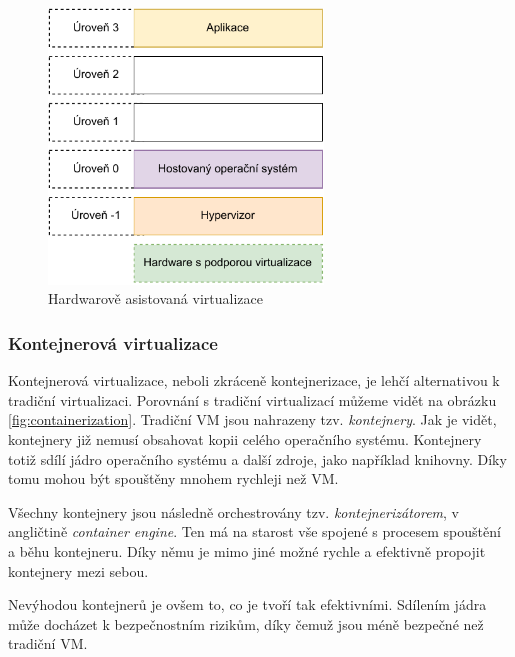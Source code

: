 \begin{figure}[htbp]
    \centering 
    \includegraphics[width=0.65\textwidth]{assets/img/hardware-asssist-virt.pdf}
    \caption{Hardwarově asistovaná virtualizace}
    \label{fig:hardware_asssist_virt}
\end{figure}

\subsubsection{Kontejnerová virtualizace}

Kontejnerová virtualizace, neboli zkráceně kontejnerizace, je lehčí alternativou k tradiční virtualizaci. Porovnání s tradiční virtualizací můžeme vidět na obrázku \ref{fig:containerization}. Tradiční VM jsou nahrazeny tzv. \textit{kontejnery}. Jak je vidět, kontejnery již nemusí obsahovat kopii celého operačního systému. Kontejnery totiž sdílí jádro operačního systému a další zdroje, jako například knihovny. Díky tomu mohou být spouštěny mnohem rychleji než VM. \cite{8693491}

Všechny kontejnery jsou následně orchestrovány tzv. \textit{kontejnerizátorem}, v angličtině \textit{container engine}. Ten má na starost vše spojené s procesem spouštění a běhu kontejneru. Díky němu je mimo jiné možné rychle a efektivně propojit kontejnery mezi sebou.\cite{Bentaleb2021} 

Nevýhodou kontejnerů je ovšem to, co je tvoří tak efektivními. Sdílením jádra může docházet k bezpečnostním rizikům, díky čemuž jsou méně bezpečné než tradiční VM.\cite{6498558}


